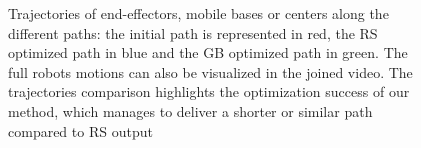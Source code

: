\documentclass{tADR2e}
\begin{document}
\begin{figure}
{		\label{fig:trajectories:ur5}
	}
  \caption{Trajectories of end-effectors, mobile bases or centers along the 
  different paths: the initial path is represented in red, the RS optimized path in 
  blue and the GB optimized path in green. The full robots 
  motions can also be visualized in the joined video. The trajectories comparison 
  highlights the optimization success of our method, which manages to deliver a 
  shorter or similar path compared to RS output}
  \label{fig:trajectories}
\end{figure}
\end{document}
